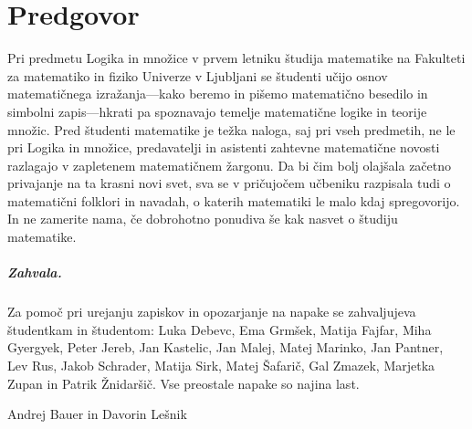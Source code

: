 \chapter*{Predgovor}
\label{chap:predgovor}

Pri predmetu Logika in množice v prvem letniku študija matematike na Fakulteti za matematiko in fiziko Univerze v Ljubljani se študenti učijo osnov matematičnega izražanja---kako beremo in pišemo matematično besedilo in simbolni zapis---hkrati pa spoznavajo temelje matematične logike in teorije množic.
%
Pred študenti matematike je težka naloga, saj pri vseh predmetih, ne le pri Logika in množice, predavatelji in asistenti zahtevne matematične novosti razlagajo v zapletenem matematičnem žargonu.
%
Da bi čim bolj olajšala začetno privajanje na ta krasni novi svet, sva se v pričujočem učbeniku razpisala tudi o matematični folklori in navadah, o katerih matematiki le malo kdaj spregovorijo.
%
In ne zamerite nama, če dobrohotno ponudiva še kak nasvet o študiju matematike.


\paragraph{Zahvala.}
%
Za pomoč pri urejanju zapiskov in opozarjanje na napake se zahvaljujeva študentkam in študentom:
%
Luka Debevc,
Ema Grmšek,
Matija Fajfar,
Miha Gyergyek,
Peter Jereb,
Jan Kastelic,
Jan Malej,
Matej Marinko,
Jan Pantner,
Lev Rus,
Jakob Schrader,
Matija Sirk,
Matej Šafarič,
Gal Zmazek,
Marjetka Zupan in Patrik Žnidaršič.
%
Vse preostale napake so najina last.
\bigskip

\begin{flushright}
Andrej Bauer in Davorin Lešnik
\end{flushright}

\bigskip


